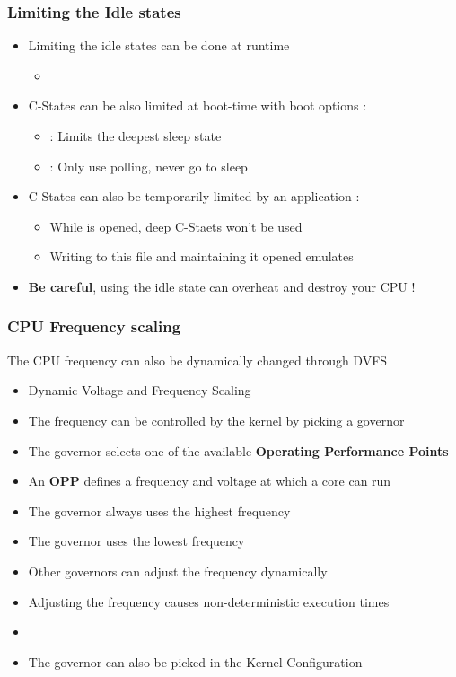 \begin{frame}
	\frametitle{Limiting the Idle states}
	\begin{itemize}
		\item Limiting the idle states can be done at runtime
			\begin{itemize}
				\item {}
			\end{itemize}
		\item C-States can be also limited at boot-time with boot options :
			\begin{itemize}
				\item {} : Limits the deepest sleep state
				\item {} : Only use polling, never go to sleep
			\end{itemize}
		\item C-States can also be temporarily limited by an application :
			\begin{itemize}
				\item While  is opened, deep C-Staets won't be used
				\item Writing  to this file and maintaining it opened emulates 
			\end{itemize}
		\item \textbf{Be careful}, using the  idle state can overheat and destroy your CPU !
	\end{itemize}
\end{frame}

\begin{frame}
	\frametitle{CPU Frequency scaling}
	The CPU frequency can also be dynamically changed through DVFS
	\begin{itemize}
		\item Dynamic Voltage and Frequency Scaling
		\item The frequency can be controlled by the kernel by picking a governor
		\item The governor selects one of the available \textbf{Operating Performance Points}
		\item An \textbf{OPP} defines a frequency and voltage at which a core can run
		\item The  governor always uses the highest frequency
		\item The  governor uses the lowest frequency
		\item Other governors can adjust the frequency dynamically
		\item Adjusting the frequency causes non-deterministic execution times
		\item {}
		\item The governor can also be picked in the Kernel Configuration
	\end{itemize}
\end{frame}

